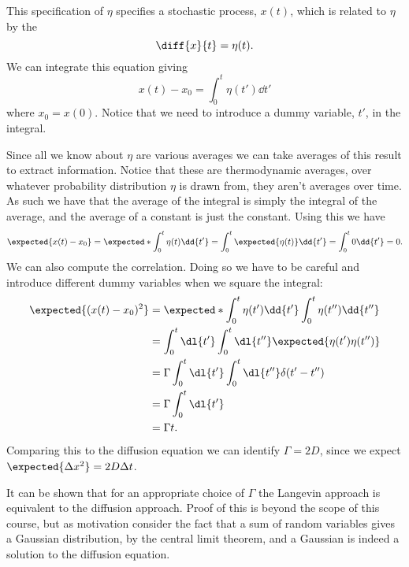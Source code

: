 \documentclass[fleqn]{NotesClass}
\begin{document}
    This specification of \(\eta\) specifies a stochastic process, \(x(t)\), which is related to \(\eta\) by the 
    \begin{equation}
        \diff{x}{t} = \eta(t).
    \end{equation}
    We can integrate this equation giving
    \begin{equation}
        x(t) - x_0 = \int_0^t \eta(t') \dd{t'}
    \end{equation}
    where \(x_0 = x(0)\).
    Notice that we need to introduce a dummy variable, \(t'\), in the integral.
    
    Since all we know about \(\eta\) are various averages we can take averages of this result to extract information.
    Notice that these are thermodynamic averages, over whatever probability distribution \(\eta\) is drawn from, they aren't averages over time.
    As such we have that the average of the integral is simply the integral of the average, and the average of a constant is just the constant.
    Using this we have
    \begin{equation}
        \expected{x(t) - x_0} = \expected*{\int_0^t \eta(t) \dd{t'}} = \int_0^t \expected{\eta(t)} \dd{t'} = \int_0^t 0 \dd{t'} = 0.
    \end{equation}
    We can also compute the correlation.
    Doing so we have to be careful and introduce different dummy variables when we square the integral:
    \begin{align}
        \expected{(x(t) - x_0)^2} &= \expected*{\int_0^t \eta(t') \dd{t'} \int_0^t \eta(t'') \dd{t''}}\\
        &= \int_0^t \dl{t'} \int_0^t \dl{t''} \expected{\eta(t') \eta(t'')}\\
        &= \Gamma \int_0^t \dl{t'} \int_0^t \dl{t''} \delta(t' - t'')\\
        &= \Gamma \int_0^t \dl{t'}\\
        &= \Gamma t.
    \end{align}
    Comparing this to the diffusion equation we can identify \(\Gamma = 2D\), since we expect \(\expected{\Delta x^2} = 2D\Delta t\).
    
    It can be shown that for an appropriate choice of \(\Gamma\) the Langevin approach is equivalent to the diffusion approach.
    Proof of this is beyond the scope of this course, but as motivation consider the fact that a sum of random variables gives a Gaussian distribution, by the central limit theorem, and a Gaussian is indeed a solution to the diffusion equation.
    
\end{document}
